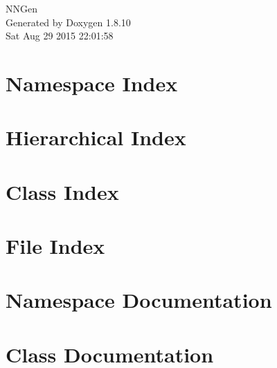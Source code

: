 \documentclass[twoside]{book}
\newcommand{\+}{\discretionary{\mbox{\scriptsize$\hookleftarrow$}}{}{}}
\newcommand{\clearemptydoublepage}{%
  \newpage{\pagestyle{empty}\cleardoublepage}%
}
\begin{document}
\hypersetup{pageanchor=false,
             bookmarks=true,
             bookmarksnumbered=true,
             pdfencoding=unicode
            }
\begin{titlepage}
\vspace*{7cm}
\begin{center}%
{\Large N\+N\+Gen }\\
\vspace*{1cm}
{\large Generated by Doxygen 1.8.10}\\
\vspace*{0.5cm}
{\small Sat Aug 29 2015 22:01:58}\\
\end{center}
\end{titlepage}
\clearemptydoublepage
\tableofcontents
\clearemptydoublepage
{}
\hypersetup{pageanchor=true}

\chapter{Namespace Index}

\chapter{Hierarchical Index}

\chapter{Class Index}

\chapter{File Index}

\chapter{Namespace Documentation}

\chapter{Class Documentation}



























\end{document}
